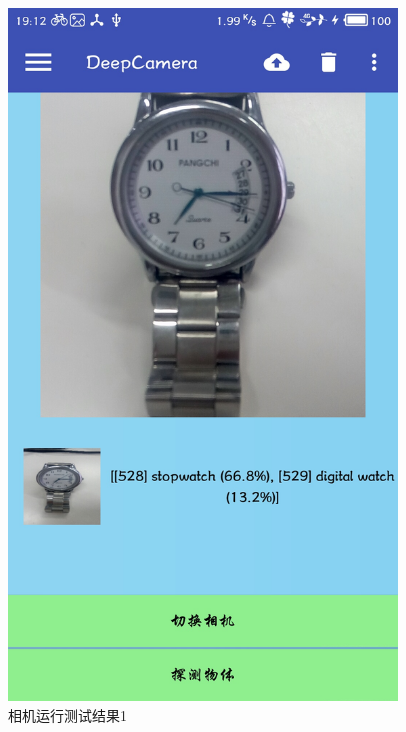 \documentclass[UTF8, Microsoft YaHei]{book}
\begin{document}
\begin{figure}[!htb]
\begin{minipage}[c]{0.5\textwidth}
    \includegraphics[width=0.92\textwidth]{img/test2.png}
    \end{minipage}
    \caption{相机运行测试结果1}
    \end{figure}
\end{document}
